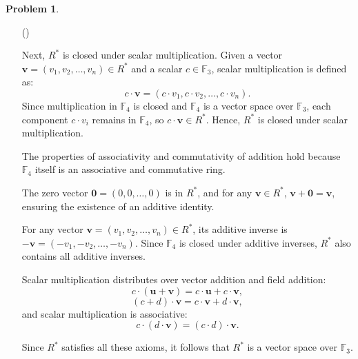 \documentclass[12pt]{article}
\theoremstyle{definition}
\newtheorem{problem}{Problem}
\newcounter{subq}[problem]
\newenvironment{subproblem}
{\refstepcounter{subq} \begin{itemize} \item[(\alph{subq})]}
{\end{itemize} \medskip}
\begin{document}
\begin{problem}
\begin{subproblem}
\begin{solution}
            Next, \( R^* \) is closed under scalar multiplication. Given a vector \( \mathbf{v} = (v_1, v_2, \ldots, v_n) \in R^* \) and a scalar \( c \in \mathbb{F}_3 \), scalar multiplication is defined as:
            \[
            c \cdot \mathbf{v} = (c \cdot v_1, c \cdot v_2, \ldots, c \cdot v_n).
            \]
            Since multiplication in \( \mathbb{F}_4 \) is closed and \( \mathbb{F}_4 \) is a vector space over \( \mathbb{F}_3 \), each component \( c \cdot v_i \) remains in \( \mathbb{F}_4 \), so \( c \cdot \mathbf{v} \in R^* \). Hence, \( R^* \) is closed under scalar multiplication.

            The properties of associativity and commutativity of addition hold because \( \mathbb{F}_4 \) itself is an associative and commutative ring.

            The zero vector \( \mathbf{0} = (0, 0, \ldots, 0) \) is in \( R^* \), and for any \( \mathbf{v} \in R^* \), \( \mathbf{v} + \mathbf{0} = \mathbf{v} \), ensuring the existence of an additive identity.

            For any vector \( \mathbf{v} = (v_1, v_2, \ldots, v_n) \in R^* \), its additive inverse is \( -\mathbf{v} = (-v_1, -v_2, \ldots, -v_n) \). Since \( \mathbb{F}_4 \) is closed under additive inverses, \( R^* \) also contains all additive inverses.

            Scalar multiplication distributes over vector addition and field addition:
            \[
            c \cdot (\mathbf{u} + \mathbf{v}) = c \cdot \mathbf{u} + c \cdot \mathbf{v},
            \]
            \[
            (c + d) \cdot \mathbf{v} = c \cdot \mathbf{v} + d \cdot \mathbf{v},
            \]
            and scalar multiplication is associative:
            \[
            c \cdot (d \cdot \mathbf{v}) = (c \cdot d) \cdot \mathbf{v}.
            \]

            Since \( R^* \) satisfies all these axioms, it follows that \( R^* \) is a vector space over \( \mathbb{F}_3 \).

        \end{solution}
    \end{subproblem}
\end{problem}
\end{document}
